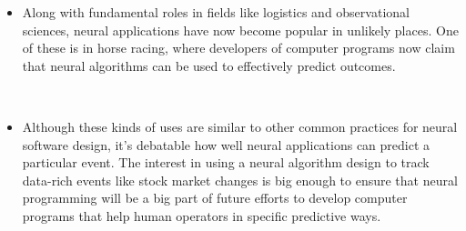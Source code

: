 \documentclass[12pt]{article}
\begin{document}
\begin{itemize}
 
\item
Along with fundamental roles in fields like logistics and observational sciences, neural applications have now become popular in unlikely places. One of these is in horse racing, where developers of computer programs now claim that neural algorithms can be used to effectively predict outcomes.

 
\item 
Although these kinds of uses are similar to other common practices for neural software design, it's debatable how well neural applications can predict a particular event. The interest in using a neural algorithm design to track data-rich events like stock market changes is big enough to ensure that neural programming will be a big part of future efforts to develop computer programs that help human operators in specific predictive ways.

\end{itemize} 
\end{document}
